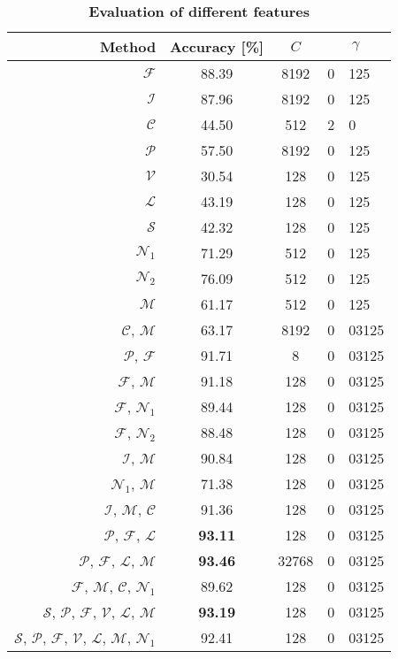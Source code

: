 \documentclass[11pt,english]{article}
\begin{document}
\begin{table*}[htb]
\begin{center}%
\caption{\small \textbf{\textsf{Evaluation of different features}}}%
\begin{tabular}{r c c r@{.}l}%
\toprule%
Method & Accuracy [\%] & $C$ & \multicolumn{2}{c}{$\gamma$} \\
\midrule
$\mathcal{F}$ & 88.39 & 8192 & 0 & 125\\
$\mathcal{I}$ & 87.96 & 8192 & 0 & 125\\
$\mathcal{C}$ & 44.50 & 512 & 2 & 0\\
$\mathcal{P}$ & 57.50 & 8192 & 0 & 125\\
$\mathcal{V}$ & 30.54 & 128 & 0 & 125\\
$\mathcal{L}$ & 43.19 & 128 & 0 & 125\\
$\mathcal{S}$ & 42.32 & 128 & 0 & 125\\
$\mathcal{N}_1$ & 71.29 & 512 & 0 & 125\\
$\mathcal{N}_2$ & 76.09 & 512 & 0 & 125\\
$\mathcal{M}$ & 61.17 & 512 & 0 & 125\\
$\mathcal{C}$, $\mathcal{M}$ & 63.17 & 8192 & 0 & 03125\\
$\mathcal{P}$, $\mathcal{F}$ & 91.71 & 8 & 0 & 03125\\
$\mathcal{F}$, $\mathcal{M}$ & 91.18 & 128 & 0 & 03125\\
$\mathcal{F}$, $\mathcal{N}_1$ & 89.44 & 128 & 0 & 03125\\
$\mathcal{F}$, $\mathcal{N}_2$ & 88.48 & 128 & 0 & 03125\\
$\mathcal{I}$, $\mathcal{M}$ & 90.84 & 128 & 0 & 03125\\
$\mathcal{N}_1$, $\mathcal{M}$ & 71.38 & 128 & 0 & 03125\\
$\mathcal{I}$, $\mathcal{M}$, $\mathcal{C}$ & 91.36 & 128 & 0 & 03125\\
$\mathcal{P}$, $\mathcal{F}$, $\mathcal{L}$ & \textbf{93.11} & 128 & 0 & 03125\\
$\mathcal{P}$, $\mathcal{F}$, $\mathcal{L}$, $\mathcal{M}$ & \textbf{93.46} & 32768 & 0 & 03125\\
$\mathcal{F}$, $\mathcal{M}$, $\mathcal{C}$, $\mathcal{N}_1$ & 89.62 & 128 & 0 & 03125\\
$\mathcal{S}$, $\mathcal{P}$, $\mathcal{F}$, $\mathcal{V}$, $\mathcal{L}$, $\mathcal{M}$ & \textbf{93.19} & 128 & 0 & 03125\\
$\mathcal{S}$, $\mathcal{P}$, $\mathcal{F}$, $\mathcal{V}$, $\mathcal{L}$, $\mathcal{M}$, $\mathcal{N}_1$ & 92.41 & 128 & 0 & 03125\\
\bottomrule%
\end{tabular}%
\label{tbl:eval}%
\end{center}
\end{table*}
\end{document}
